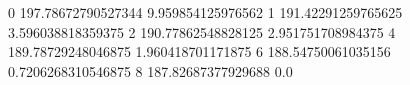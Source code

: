 0 197.78672790527344 9.959854125976562
1 191.42291259765625 3.596038818359375
2 190.77862548828125 2.951751708984375
4 189.78729248046875 1.960418701171875
6 188.54750061035156 0.7206268310546875
8 187.82687377929688 0.0
